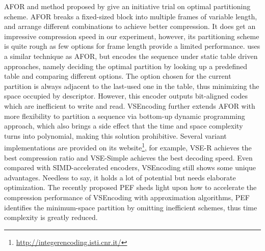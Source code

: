 \documentclass[runningheads,a4paper]{llncs}
\begin{document}

AFOR and method proposed by \cite{anh2004index} give an initiative trial on optimal partitioning scheme.
AFOR breaks a fixed-sized block into multiple frames of variable length, and arrange different combinations to achieve better compression.
It does get an impressive compression speed in our experiment, however, its partitioning scheme is quite rough as few options for frame length provide a limited performance.
\cite{anh2004index} uses a similar technique as AFOR, but encodes the sequence under static table driven approaches, namely deciding the optimal partition by looking up a predefined table and comparing different options.
The option chosen for the current partition is always adjacent to the last-used one in the table, thus minimizing the space occupied by descriptor.
However, this encoder outputs bit-aligned codes which are inefficient to write and read.
VSEncoding further extends AFOR with more flexibility to partition a sequence via bottom-up dynamic programming approach, which also brings a side effect that the time and space complexity turns into polynomial, making this solution prohibitive.
Several variant implementations are provided on its website\footnote{\url{http://integerencoding.isti.cnr.it/}}, for example, VSE-R achieves the best compression ratio and VSE-Simple achieves the best decoding speed.
Even compared with SIMD-accelerated encoders, VSEncoding still shows some unique advantages.
Needless to say, it holds a lot of potential but needs elaborate optimization. The recently proposed PEF sheds light upon how to accelerate the compression performance of VSEncoding with approximation algorithms, PEF identifies the minimum-space partition by omitting inefficient schemes, thus time complexity is greatly reduced.
\end{document}
